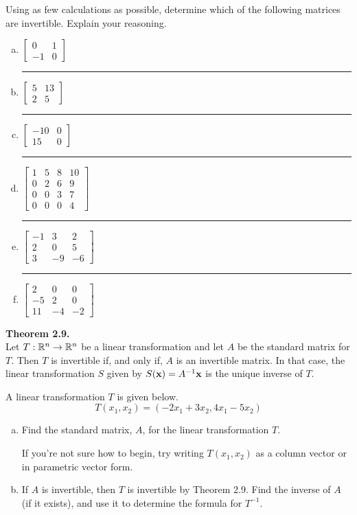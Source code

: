 \begin{exercise} %
	Using as few calculations as possible, determine which of the following matrices are invertible. Explain your reasoning.
	\begin{enumerate}[(a)]
		\item $\begin{bmatrix}0&1\\-1&0\end{bmatrix}$ \vfill\hrule\vfill
		\item $\begin{bmatrix}5&13\\2&5\end{bmatrix}$ \vfill\hrule\vfill
		\item $\begin{bmatrix}-10&0\\15&0\end{bmatrix}$ \vfill\hrule\vfill
		\item $\begin{bmatrix}1&5&8&10\\0&2&6&9\\0&0&3&7\\0&0&0&4\end{bmatrix}$ \vfill\hrule\vfill
		\item $\begin{bmatrix}-1&3&2\\2&0&5\\3&-9&-6\end{bmatrix}$ \vfill\hrule\vfill
		\item $\begin{bmatrix}2&0&0\\-5&2&0\\11&-4&-2\end{bmatrix}$ \vfill
	\end{enumerate}
\end{exercise}


\newpage


\begin{boxthm}
	\textbf{Theorem 2.9.} \\
	Let $T:\mathbb{R}^{n}\to\mathbb{R}^{n}$ be a linear transformation and let $A$ be the standard matrix for $T$. Then $T$ is invertible if, and only if, $A$ is an invertible matrix. In that case, the linear transformation $S$ given by $S(\boldsymbol{\mathbf{x}})=A^{-1}\boldsymbol{\mathbf{x}}$ is the unique inverse of $T$.
\end{boxthm}

\begin{exercise} %
	A linear transformation $T$ is given below.
	$$ T(x_1,x_2) = (-2x_1+3x_2,4x_1-5x_2) $$
	\begin{enumerate}[(a)]
		\item Find the standard matrix, $A$, for the linear transformation $T$. \par
		If you're not sure how to begin, try writing $T(x_1,x_2)$ as a column vector or in parametric vector form.
		\vfill
		\item If $A$ is invertible, then $T$ is invertible by Theorem 2.9. Find the inverse of $A$ (if it exists), and use it to determine the formula for $T^{-1}$.
		\vfill
	\end{enumerate}
\end{exercise}


